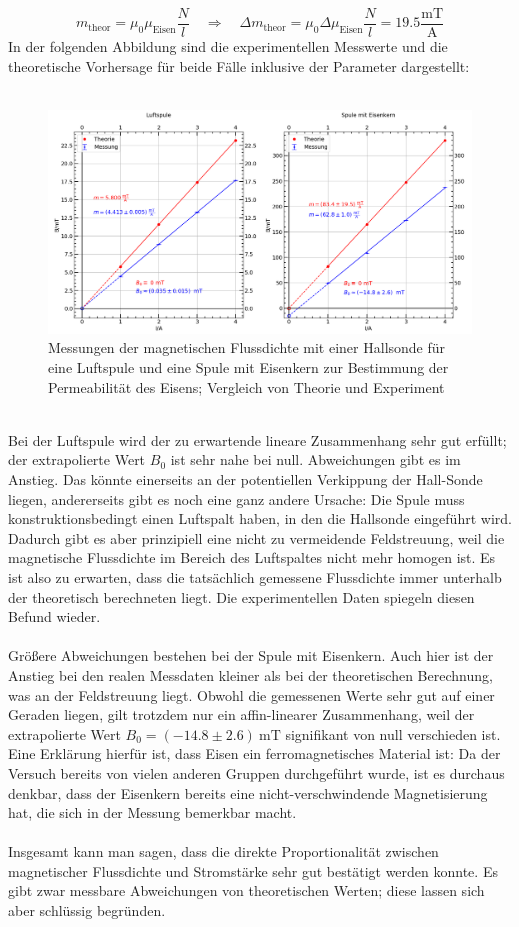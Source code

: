 \documentclass[german,  %
parskip=full,  %
]{scrartcl}
\begin{document}
\[m_{\mathrm{theor}} = \mu_0\mu_{\mathrm{Eisen}}\frac{N}{l} \quad\Longrightarrow\quad \Delta m_{\mathrm{theor}} = \mu_0\Delta\mu_{\mathrm{Eisen}}\frac{N}{l} = 19.5 \frac{\mathrm{mT}}{\mathrm{A}}\]
In der folgenden Abbildung sind die experimentellen Messwerte und die theoretische Vorhersage für beide Fälle inklusive der Parameter dargestellt: \\\\
\begin{figure}[h!]\centering
\includegraphics[width=\textwidth]{Hall_Sonde.png}
\caption{Messungen der magnetischen Flussdichte mit einer Hallsonde für eine Luftspule und eine Spule mit Eisenkern zur Bestimmung der Permeabilität des Eisens; Vergleich von Theorie und Experiment}
\end{figure}  \\
Bei der Luftspule wird der zu erwartende lineare Zusammenhang sehr gut erfüllt; der extrapolierte Wert \(B_0\) ist sehr nahe bei null. Abweichungen gibt es im Anstieg. Das könnte einerseits an der potentiellen Verkippung der Hall-Sonde liegen, andererseits gibt es noch eine ganz andere Ursache: Die Spule muss konstruktionsbedingt einen Luftspalt haben, in den die Hallsonde eingeführt wird. Dadurch gibt es aber prinzipiell eine nicht zu vermeidende Feldstreuung, weil die magnetische Flussdichte im Bereich des Luftspaltes nicht mehr homogen ist. Es ist also zu erwarten, dass die tatsächlich gemessene Flussdichte immer unterhalb der theoretisch berechneten liegt. Die experimentellen Daten spiegeln diesen Befund wieder. \\\\
Größere Abweichungen bestehen bei der Spule mit Eisenkern. Auch hier ist der Anstieg bei den realen Messdaten kleiner als bei der theoretischen Berechnung, was an der Feldstreuung liegt. Obwohl die gemessenen Werte sehr gut auf einer Geraden liegen, gilt trotzdem nur ein affin-linearer Zusammenhang, weil der extrapolierte Wert \(B_0 = (-14.8 \pm 2.6) \ \mathrm{mT}\) signifikant von null verschieden ist. Eine Erklärung hierfür ist, dass Eisen ein ferromagnetisches Material ist: Da der Versuch bereits von vielen anderen Gruppen durchgeführt wurde, ist es durchaus denkbar, dass der Eisenkern bereits eine nicht-verschwindende Magnetisierung hat, die sich in der Messung bemerkbar macht. \\\\
Insgesamt kann man sagen, dass die direkte Proportionalität zwischen magnetischer Flussdichte und Stromstärke sehr gut bestätigt werden konnte. Es gibt zwar messbare Abweichungen von theoretischen Werten; diese lassen sich aber schlüssig begründen.
\end{document}

